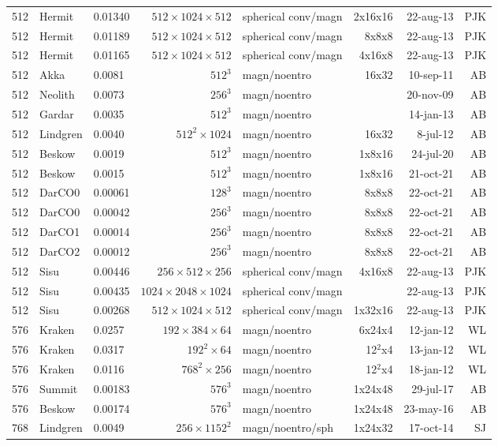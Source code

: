 \documentclass[\mydriver,12pt,twoside,notitlepage,a4paper]{article}
\begin{document}
\begin{center}
\begin{footnotesize}
\begin{longtable}{rllrlrrr}
 512 &Hermit&0.01340&$512{\!\times\!}1024{\!\times\!}512$&spherical conv/magn&2x16x16&22-aug-13&PJK\\
 512 &Hermit&0.01189&$512{\!\times\!}1024{\!\times\!}512$&spherical conv/magn&8x8x8&22-aug-13&PJK\\
 512 &Hermit&0.01165&$512{\!\times\!}1024{\!\times\!}512$&spherical conv/magn&4x16x8&22-aug-13&PJK\\
 512 & Akka  &0.0081& $512^3$ & magn/noentro & 16x32  & 10-sep-11 & AB \\
 512 &Neolith&0.0073& $256^3$ & magn/noentro &        & 20-nov-09 & AB \\
 512 &Gardar &0.0035& $512^3$ & magn/noentro &        & 14-jan-13 & AB \\
 512 &Lindgren&0.0040&$512^2{\!\times\!}1024$&magn/noentro&16x32& 8-jul-12 & AB \\
 512 &Beskow &0.0019& $512^3$ & magn/noentro & 1x8x16 & 24-jul-20 & AB \\
 512 &Beskow &0.0015& $512^3$ & magn/noentro & 1x8x16 & 21-oct-21 & AB \\
 512 &DarCO0 &0.00061&$128^3$ & magn/noentro & 8x8x8  & 22-oct-21 & AB \\
 512 &DarCO0 &0.00042&$256^3$ & magn/noentro & 8x8x8  & 22-oct-21 & AB \\
 512 &DarCO1 &0.00014&$256^3$ & magn/noentro & 8x8x8  & 22-oct-21 & AB \\
 512 &DarCO2 &0.00012&$256^3$ & magn/noentro & 8x8x8  & 22-oct-21 & AB \\
 512&Sisu&0.00446&$256{\!\times\!}512{\!\times\!}256$&spherical conv/magn&4x16x8&22-aug-13&PJK\\
 512&Sisu&0.00435&$1024{\!\times\!}2048{\!\times\!}1024$&spherical conv/magn& &22-aug-13&PJK\\
 512&Sisu&0.00268&$512{\!\times\!}1024{\!\times\!}512$&spherical conv/magn&1x32x16&22-aug-13&PJK\\
 576 &Kraken&0.0257&$192{\!\times\!}384{\!\times\!}64$&magn/noentro&6x24x4&12-jan-12&WL\\
 576 &Kraken& 0.0317  &$192^2{\!\times\!}64$ & magn/noentro & 12$^2$x4 &13-jan-12 & WL\\
 576 &Kraken& 0.0116  &$768^2{\!\times\!}256$ & magn/noentro & 12$^2$x4 &18-jan-12 & WL\\
 576&Summit&0.00183&$576^3$&magn/noentro&1x24x48&29-jul-17& AB \\
 576&Beskow&0.00174&$576^3$&magn/noentro&1x24x48&23-may-16& AB \\
 768 &Lindgren&0.0049&$256{\!\times\!}1152^2$&magn/noentro/sph&1x24x32& 17-oct-14 & SJ \\

\end{longtable}
\end{footnotesize}
\end{center}
\end{document}
